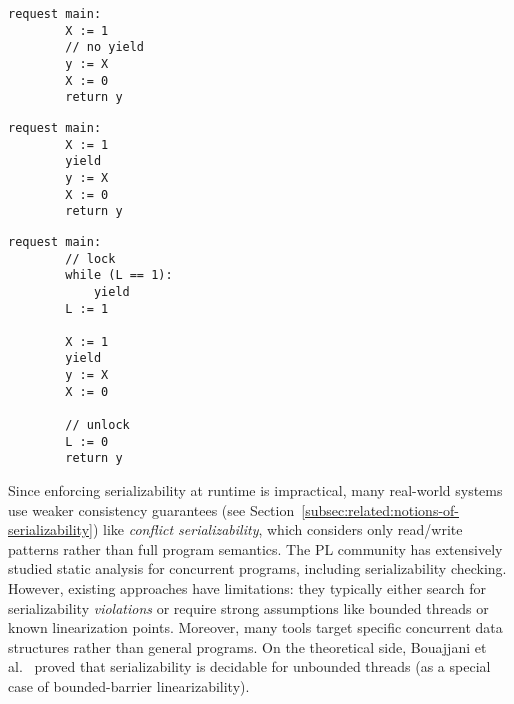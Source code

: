 \noindent
\begin{minipage}[t]{0.45\textwidth}
	\begin{minipage}[t]{\textwidth}
		\begin{lstlisting}[caption={Without yield or lock (serializable)},
			label={lst:MotivatingExample1Ser}]
    request main: 
        X := 1 
        // no yield
        y := X 
        X := 0
        return y 
		\end{lstlisting}
	\end{minipage}
	\vspace{1em}
	\begin{minipage}[t]{\textwidth}
		\begin{lstlisting}[caption={With yield (not serializable)},
			label={lst:MotivatingExample2NonSer}]
    request main: 
        X := 1 
        yield 
        y := X 
        X := 0
        return y 	
		\end{lstlisting}
	\end{minipage}
\end{minipage}%
\hfill
\begin{minipage}[t]{0.45\textwidth}
	\begin{lstlisting}[caption={With yield and lock (serializable)},
		label={lst:MotivatingExample3Ser}]
    request main: 
        // lock
        while (L == 1): 
            yield
        L := 1 

        X := 1
        yield
        y := X 
        X := 0

        // unlock    
        L := 0
        return y 
	\end{lstlisting}
\end{minipage}



Since enforcing serializability at runtime is impractical, many real-world systems use weaker consistency guarantees (see Section~\ref{subsec:related:notions-of-serializability}) like \textit{conflict serializability}, which considers only read/write patterns rather than full program semantics. The PL community has extensively studied static analysis for concurrent programs, including serializability checking. However, existing approaches have limitations: they typically either search for serializability \textit{violations} or require strong assumptions like bounded threads or known linearization points.
Moreover, many tools target specific concurrent data structures rather than general programs.
%
On the theoretical side, Bouajjani et al.~\cite{BoEmEnHa13} proved that serializability is decidable for unbounded threads (as a special case of bounded-barrier linearizability).


